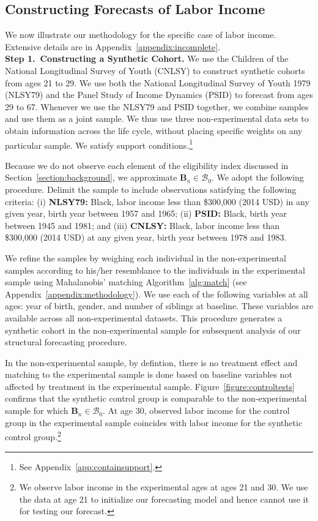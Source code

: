 \subsection{Constructing Forecasts of Labor Income}

We now illustrate our methodology for the specific case of labor income. Extensive details are in Appendix~\ref{appendix:incomplete}.\\

\noindent \textbf{Step 1.\ Constructing a Synthetic Cohort.} We use the Children of the National Longitudinal Survey of Youth (CNLSY) to construct synthetic cohorts from ages 21 to 29. We use both the National Longitudinal Survey of Youth 1979 (NLSY79) and the Panel Study of Income Dynamics (PSID) to forecast from ages 29 to 67. Whenever we use the NLSY79 and PSID together, we combine samples and use them as a joint sample. We thus use three non-experimental data sets to obtain information across the life cycle, without placing specific weights on any particular sample. We satisfy support conditions.\footnote{See Appendix~\ref{app:containsupport}.}

Because we do not observe each element of the eligibility index discussed in Section~\ref{section:background}, we approximate $\bm{B}_{n} \in \mathcal{B}_0$. We adopt the following procedure. Delimit the sample to include observations satisfying the following criteria: (i) \textbf{NLSY79:} Black, labor income less than \$300,000 (2014 USD) in any given year, birth year between 1957 and 1965; (ii) \textbf{PSID:} Black, birth year between 1945 and 1981; and (iii) \textbf{CNLSY:} Black, labor income less than \$300,000 (2014 USD) at any given year, birth year between 1978 and 1983.

We refine the samples by weighing each individual in the non-experimental samples according to his/her resemblance to the individuals in the experimental sample using Mahalanobis' matching Algorithm~\ref{alg:match} (see Appendix~\ref{appendix:methodology}). We use each of the following variables at all ages: year of birth, gender, and number of siblings at baseline. These variables are available across all non-experimental datasets. This procedure generates a synthetic cohort in the non-experimental sample for subsequent analysis of our structural forecasting procedure.

In the non-experimental sample, by defintion, there is no treatment effect and matching to the experimental sample is done based on baseline variables not affected by treatment in the experimental sample. Figure~\ref{figure:controltests} confirms that the synthetic control group is comparable to the non-experimental sample for which $\bm{B}_{n} \in \mathcal{B}_0$. At age 30, observed labor income for the control group in the experimental sample coincides with labor income for the synthetic control group.\footnote{We observe labor income in the experimental ages at ages 21 and 30. We use the data at age 21 to initialize our forecasting model and hence cannot use it for testing our forecast.}

